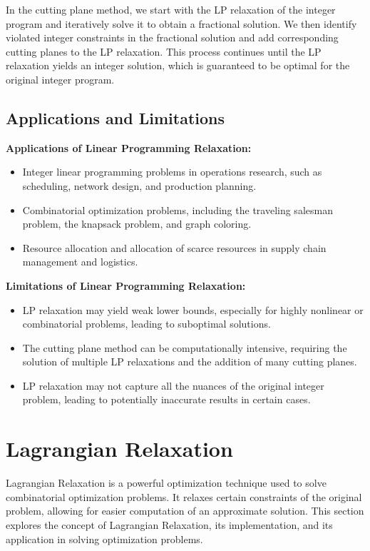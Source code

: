 \documentclass[12pt]{book} %
\begin{document}
In the cutting plane method, we start with the LP relaxation of the integer program and iteratively solve it to obtain a fractional solution. We then identify violated integer constraints in the fractional solution and add corresponding cutting planes to the LP relaxation. This process continues until the LP relaxation yields an integer solution, which is guaranteed to be optimal for the original integer program.

\subsection{Applications and Limitations}

\textbf{Applications of Linear Programming Relaxation:}
\begin{itemize}
    \item Integer linear programming problems in operations research, such as scheduling, network design, and production planning.
    \item Combinatorial optimization problems, including the traveling salesman problem, the knapsack problem, and graph coloring.
    \item Resource allocation and allocation of scarce resources in supply chain management and logistics.
\end{itemize}

\textbf{Limitations of Linear Programming Relaxation:}
\begin{itemize}
    \item LP relaxation may yield weak lower bounds, especially for highly nonlinear or combinatorial problems, leading to suboptimal solutions.
    \item The cutting plane method can be computationally intensive, requiring the solution of multiple LP relaxations and the addition of many cutting planes.
    \item LP relaxation may not capture all the nuances of the original integer problem, leading to potentially inaccurate results in certain cases.
\end{itemize}


\section{Lagrangian Relaxation}

Lagrangian Relaxation is a powerful optimization technique used to solve combinatorial optimization problems. It relaxes certain constraints of the original problem, allowing for easier computation of an approximate solution. This section explores the concept of Lagrangian Relaxation, its implementation, and its application in solving optimization problems.
\end{document}
